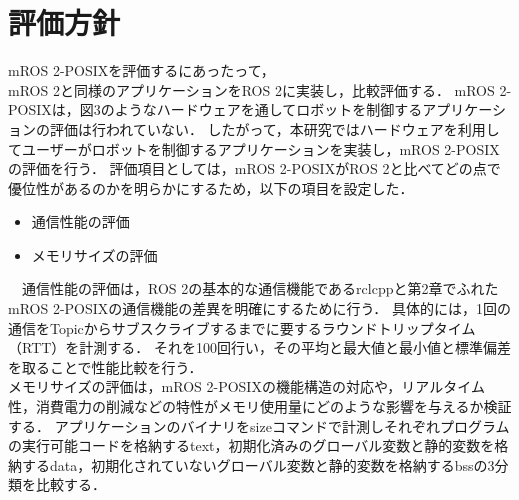 \documentclass[11pt]{ujarticle}
\begin{document}
\section{評価方針}
mROS 2-POSIXを評価するにあったって，\\mROS 2と同様のアプリケーションをROS 2に実装し，比較評価する．
mROS 2-POSIXは，図3のようなハードウェアを通してロボットを制御するアプリケーションの評価は行われていない．
したがって，本研究ではハードウェアを利用してユーザーがロボットを制御するアプリケーションを実装し，mROS 2-POSIXの評価を行う．
評価項目としては，mROS 2-POSIXがROS 2と比べてどの点で優位性があるのかを明らかにするため，以下の項目を設定した．
\begin{itemize}
	\item 通信性能の評価
	\item メモリサイズの評価
\end{itemize}
　通信性能の評価は，ROS 2の基本的な通信機能であるrclcppと第2章でふれたmROS 2-POSIXの通信機能の差異を明確にするために行う．
具体的には，1回の通信をTopicからサブスクライブするまでに要するラウンドトリップタイム（RTT）を計測する．
それを100回行い，その平均と最大値と最小値と標準偏差を取ることで性能比較を行う．
\\メモリサイズの評価は，mROS 2-POSIXの機能構造の対応や，リアルタイム性，消費電力の削減などの特性がメモリ使用量にどのような影響を与えるか検証する．
アプリケーションのバイナリをsizeコマンドで計測しそれぞれプログラムの実行可能コードを格納するtext，初期化済みのグローバル変数と静的変数を格納するdata，初期化されていないグローバル変数と静的変数を格納するbssの3分類を比較する．
\end{document}
